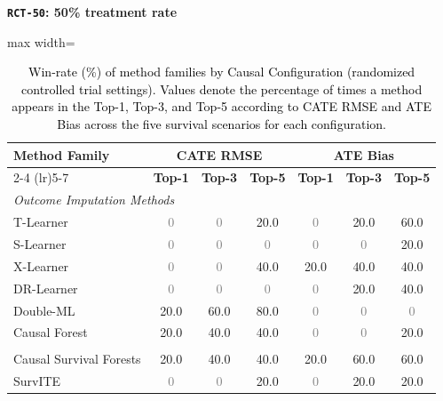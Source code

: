 \documentclass{article} %
\newcommand{\rebuttal}[1]{\textcolor{black}{#1}}
\begin{document}
\begin{table}[t]
\centering
\caption{\rebuttal{Win-rate (\%) of method families by Causal Configuration (randomized controlled trial settings). 
Values denote the percentage of times a method appears in the Top-1, Top-3, and Top-5 
according to CATE RMSE and ATE Bias across the five survival scenarios for each configuration.}}
\label{tab:winrate-rct-configs}

\begin{minipage}{0.48\textwidth}
\centering
\textbf{\texttt{RCT-50}: 50\% treatment rate}\\[0.25em]
\begin{adjustbox}{max width=\textwidth}
\begin{tabular}{lccc@{\hspace{18pt}}ccc}
\toprule
\multirow{2}{*}{\textbf{Method Family}} &
\multicolumn{3}{c}{\textbf{CATE RMSE}} &
\multicolumn{3}{c}{\textbf{ATE Bias}} \\
\cmidrule(lr){2-4} \cmidrule(lr){5-7}
& \textbf{Top-1} & \textbf{Top-3} & \textbf{Top-5}
& \textbf{Top-1} & \textbf{Top-3} & \textbf{Top-5} \\
\midrule
\multicolumn{7}{l}{\textit{Outcome Imputation Methods}} \\
T-Learner               & \textcolor{gray}{0}   & \textcolor{gray}{0}   & 20.0 & \textcolor{gray}{0}   & 20.0 & 60.0 \\
S-Learner               & \textcolor{gray}{0}   & \textcolor{gray}{0}   & \textcolor{gray}{0}   & \textcolor{gray}{0}   & \textcolor{gray}{0}   & 20.0 \\
X-Learner               & \textcolor{gray}{0}   & \textcolor{gray}{0}   & 40.0 & 20.0 & 40.0 & 40.0 \\
DR-Learner              & \textcolor{gray}{0}   & \textcolor{gray}{0}   & \textcolor{gray}{0}   & \textcolor{gray}{0}   & 20.0 & 40.0 \\
Double-ML               & 20.0 & 60.0 & 80.0 & \textcolor{gray}{0}   & \textcolor{gray}{0}   & \textcolor{gray}{0} \\
Causal Forest           & 20.0 & 40.0 & 40.0 & \textcolor{gray}{0}   & \textcolor{gray}{0}   & 20.0 \\
\addlinespace %
\multicolumn{7}{l}{\textit{Direct-Survival CATE Methods}} \\
Causal Survival Forests  & 20.0 & 40.0 & 40.0 & 20.0 & 60.0 & 60.0 \\
SurvITE                 & \textcolor{gray}{0}   & \textcolor{gray}{0}   & 20.0 & \textcolor{gray}{0}   & 20.0 & 20.0 \\

\end{tabular}
\end{adjustbox}
\end{minipage}
\end{table}
\end{document}
